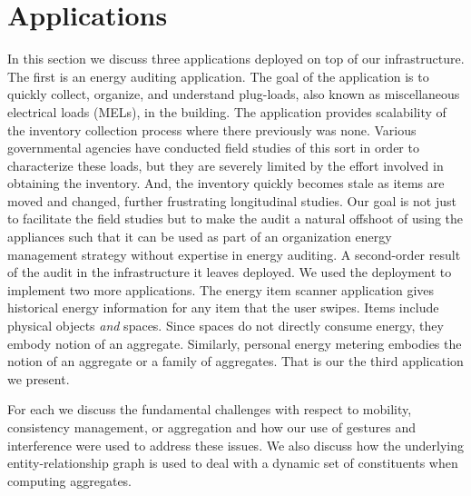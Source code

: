 \section{Applications}
\label{sec:apps}

In this section we discuss three applications deployed on top of our infrastructure.
The first is an energy auditing application.  The goal of the application is to quickly collect,
organize, and understand plug-loads, also known as miscellaneous
electrical loads (MELs), in the building.
The application provides scalability of the inventory collection process where there previously was none.
Various governmental agencies have conducted field studies of this
sort in order to characterize these loads, but they are severely
limited by the effort involved in obtaining the
inventory\cite{***http://www.efficientproducts.org/reports/plugload/Revised_Office%
                                stevel}. 
 And, the inventory quickly becomes stale as items are moved and
 changed, further frustrating longitudinal studies.  Our goal is not
 just to facilitate the field studies but to make the audit a natural
 offshoot of using the appliances such that it can be used as part of
 an organization energy management strategy without expertise in
 energy auditing.
A second-order result of the audit in the infrastructure it leaves deployed.  We used the deployment
to implement two more applications.  The energy item scanner application gives historical energy information
for any item that the user swipes.  Items include physical objects \emph{and} spaces. Since spaces do not directly 
consume energy, they embody notion of an aggregate.
Similarly, personal energy metering embodies the notion of an aggregate or a family of aggregates.  That is
our the third application we present.

For each we discuss the fundamental challenges with respect to mobility, consistency management, or aggregation and how
our use of gestures and interference were used to address these issues.  We also discuss how the underlying entity-relationship
graph is used to deal with a dynamic set of constituents when computing aggregates.


